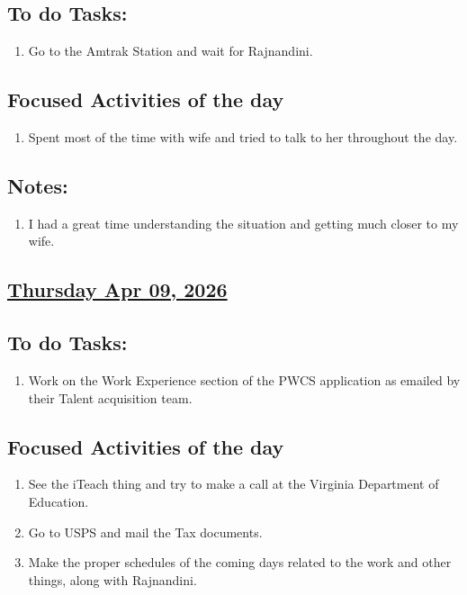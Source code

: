 \subsection*{To do Tasks:}
\begin{enumerate}
    \item Go to the  Amtrak Station and wait for Rajnandini.
\end{enumerate}
\subsection*{Focused Activities of the day}
\begin{enumerate}[\ding{212}]  
    \item Spent most of the time with wife and tried to talk to her throughout the day. 
\end{enumerate}
\subsection*{Notes:}
\begin{enumerate}
    \item I had a great time understanding the situation and getting much closer to my wife.
\end{enumerate}
\subsection*{\underline{Thursday Apr 09, 2026}}
\subsection*{To do Tasks:}
\begin{enumerate}
    \item Work on the Work Experience section of the PWCS application as emailed by their Talent acquisition team. \cmark
\end{enumerate}
\subsection*{Focused Activities of the day}
\begin{enumerate}[\ding{212}]
    \item See the iTeach thing and try to make a call at the Virginia Department of Education. \cmark
    \item Go to USPS and mail the Tax documents. \cmark   
    \item Make the proper schedules of the coming days related to the work and other things, along with Rajnandini.
\end{enumerate}
